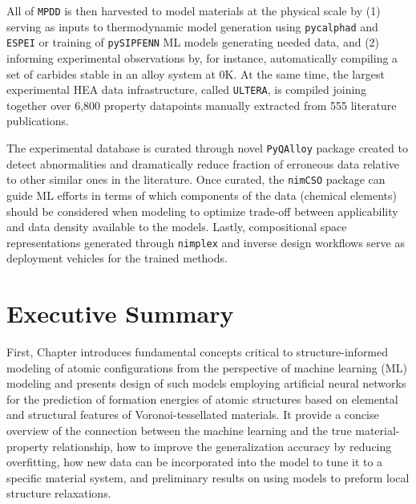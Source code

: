 All of \texttt{MPDD} is then harvested to model materials at the physical scale by (1) serving as inputs to thermodynamic model generation using \texttt{pycalphad} \cite{Otis2017Pycalphad:Python} and \texttt{ESPEI} \cite{Bocklund2019ESPEICuMg} or training of \texttt{pySIPFENN} ML models generating needed data, and (2) informing experimental observations by, for instance, automatically compiling a set of carbides stable in an alloy system at 0K. At the same time, the largest experimental HEA data infrastructure, called \texttt{ULTERA}, is compiled joining together over 6,800 property datapoints manually extracted from 555 literature publications. 

The experimental database is curated through novel \texttt{PyQAlloy} package created to detect abnormalities and dramatically reduce fraction of erroneous data relative to other similar ones in the literature. Once curated, the \texttt{nimCSO} package can guide ML efforts in terms of which components of the data (chemical elements) should be considered when modeling to optimize trade-off between applicability and data density available to the models. Lastly, compositional space representations generated through \texttt{nimplex} and inverse design workflows serve as deployment vehicles for the trained methods.




\section{Executive Summary} \label{intro:sec:summary}

First, Chapter  introduces fundamental concepts critical to structure-informed modeling of atomic configurations from the perspective of machine learning (ML) modeling and presents design of such models employing artificial neural networks for the prediction of formation energies of atomic structures based on elemental and structural features of Voronoi-tessellated materials. It provide a concise overview of the connection between the machine learning and the true material-property relationship, how to improve the generalization accuracy by reducing overfitting, how new data can be incorporated into the model to tune it to a specific material system, and preliminary results on using models to preform local structure relaxations.

